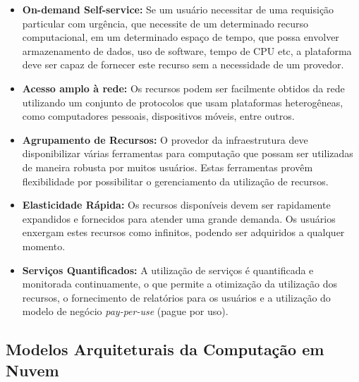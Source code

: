 \documentclass[12pt]{article}
\begin{document}
\begin{itemize}
  \item \textbf{On-demand Self-service:} Se um usuário necessitar de uma requisição particular
  com urgência, que necessite de um determinado recurso computacional, em um determinado
  espaço de tempo, que possa envolver armazenamento de dados, uso de software, tempo de CPU
  etc, a plataforma deve ser capaz de fornecer este recurso sem a necessidade de um provedor.
  \item \textbf{Acesso amplo à rede:} Os recursos podem ser facilmente obtidos da rede utilizando
  um conjunto de protocolos que usam plataformas heterogêneas, como computadores pessoais,
  dispositivos móveis, entre outros.
  \item \textbf{Agrupamento de Recursos:} O provedor da infraestrutura deve disponibilizar várias
  ferramentas para computação que possam ser utilizadas de maneira robusta por muitos usuários.
  Estas ferramentas provêm flexibilidade por possibilitar o gerenciamento da utilização de recursos.
  \item \textbf{Elasticidade Rápida:} Os recursos disponíveis devem ser rapidamente
  expandidos e fornecidos para atender uma grande demanda. Os usuários enxergam estes
  recursos como infinitos, podendo ser adquiridos a qualquer momento.
  \item \textbf{Serviços Quantificados:} A utilização de serviços é quantificada e
  monitorada continuamente, o que permite a otimização da utilização dos recursos,
  o fornecimento de relatórios para os usuários e a utilização do modelo de negócio
  \textit{pay-per-use} (pague por uso).
\end{itemize}

\subsection{Modelos Arquiteturais da Computação em Nuvem}
\end{document}
